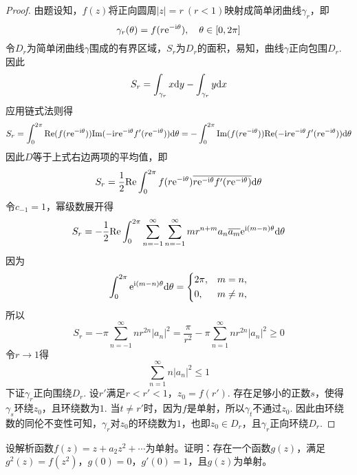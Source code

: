 \begin{proof}
    
    由题设知，$f(z)$将正向圆周$|z| = r\ (r < 1)$映射成简单闭曲线$\gamma_r$，即
    \[\gamma_r(\theta) = f(r\mathrm{e}^{-\mathrm{i} \theta}), \quad \theta \in [0, 2\pi]\]
    令$D_r$为简单闭曲线$\gamma$围成的有界区域，$S_r$为$D_r$的面积，易知，曲线$\gamma$正向包围$D_r$. \\
    因此
    \[S_r = \int_{\gamma_r}{x}\mathrm{d} y - \int_{\gamma_r}{y}\mathrm{d} x\]
    应用链式法则得
    \[S_r = \int_{0}^{2\pi}{\mathrm{Re}(f(r \mathrm{e}^{-\mathrm{i} \theta})) \mathrm{Im}(-\mathrm{i} r \mathrm{e}^{-\mathrm{i} \theta} f'(r \mathrm{e}^{-\mathrm{i} \theta}))} \mathrm{d} \theta = -\int_{0}^{2\pi}{\mathrm{Im}(f(r \mathrm{e}^{-\mathrm{i} \theta})) \mathrm{Re}(-\mathrm{i} r \mathrm{e}^{-\mathrm{i} \theta} f'(r \mathrm{e}^{-\mathrm{i} \theta}))} \mathrm{d} \theta\]
    因此$D$等于上式右边两项的平均值，即
    \[S_r = \dfrac{1}{2} \mathrm{Re}\int_{0}^{2\pi}{f(r \mathrm{e}^{-\mathrm{i} \theta}) \overline{r \mathrm{e}^{-\mathrm{i} \theta} f'(r \mathrm{e}^{-\mathrm{i} \theta})}} \mathrm{d} \theta\]
    令$c_{-1} = 1$，幂级数展开得
    \[S_r = -\dfrac{1}{2}\mathrm{Re}\int_{0}^{2\pi}{\sum\limits_{n = -1}^{\infty}{\sum\limits_{n = -1}^{\infty}{m r^{n + m}a_n \overline{a_m} \mathrm{e}^{\mathrm{i} (m - n)\theta}}}}\mathrm{d} \theta\]
    因为
    \[
        \int_{0}^{2\pi}{\mathrm{e}^{\mathrm{i}(m - n)\theta}}\mathrm{d} \theta = \left\{
        \begin{aligned}
            & 2\pi, & m = n, \\
            & 0, & m \neq n,           
        \end{aligned}
        \right.
    \]
    所以
    \[S_r = - \pi\sum\limits_{n = -1}^{\infty}{nr^{2n}|a_n|^2} = \dfrac{\pi}{r^2} - \pi\sum\limits_{n = 1}^{\infty}{nr^{2n}|a_n|^2} \geq 0\]
    令$r \to 1$得
    \[\sum\limits_{n = 1}^{\infty}{n|a_n|^2} \leq 1\]
    下证$\gamma_r$正向围绕$D_r$. 设$r'$满足$r < r' < 1$，$z_0 = f(r')$. 存在足够小的正数$s$，使得$\gamma_s$环绕$z_0$，且环绕数为$1$. 当$t \neq r'$时，因为$f$是单射，所以$\gamma_t$不通过$z_0$. 因此由环绕数的同伦不变性可知，$\gamma_r$对$z_0$的环绕数为$1$，也即$z_0 \in D_r$，且$\gamma_r$正向环绕$D_r$.

\end{proof}

\begin{lemma}\label{lemma:complex}

    设解析函数$f(z) = z + a_2 z^2 + \cdots$为单射。证明：存在一个函数$g(z)$，满足$g^2(z) = f(z^2)$，$g(0) = 0$，$g'(0) = 1$，且$g(z)$为单射。

\end{lemma}

